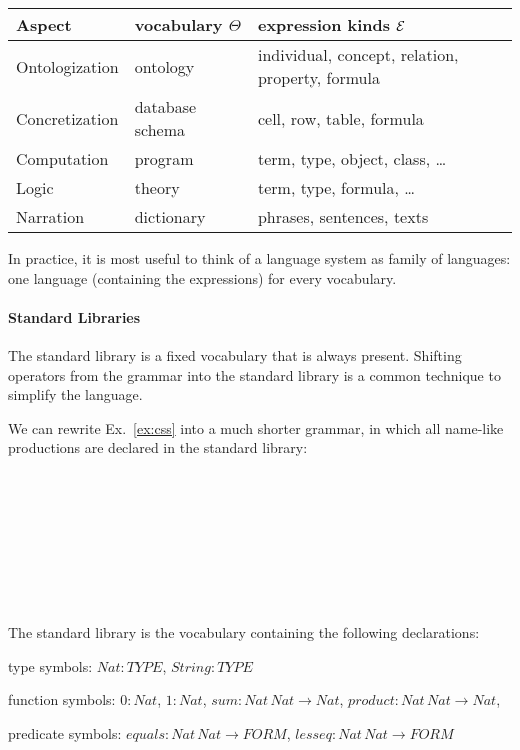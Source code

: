 \begin{center}
\begin{tabular}{l|ll}
Aspect & vocabulary $\Theta$ & expression kinds $\mathcal{E}$ \\
\hline
Ontologization  & ontology & individual, concept, relation, property, formula \\
Concretization & database schema & cell, row, table, formula \\
Computation & program & term, type, object, class, \ldots \\
Logic & theory & term, type, formula, \ldots \\
Narration & dictionary & phrases, sentences, texts \\
\end{tabular}
\end{center}

In practice, it is most useful to think of a language system as family of languages: one language (containing the expressions) for every vocabulary.

\paragraph{Standard Libraries}
The standard library is a fixed vocabulary that is always present.
Shifting operators from the grammar into the standard library is a common technique to simplify the language.

\begin{example}\label{ex:css2}
We can rewrite Ex.~\ref{ex:css} into a much shorter grammar, in which all name-like productions are declared in the standard library:
\begin{commgrammar}
\\
\\
\\
\\
\\
\\
\\
\end{commgrammar}

The standard library is the vocabulary containing the following declarations:
\begin{compactitem}
\item type symbols: $Nat: TYPE$, $String:TYPE$
\item function symbols: $0:Nat$, $1:Nat$, $sum: Nat\,Nat\to Nat$, $product: Nat\,Nat\to Nat$,
\item predicate symbols: $equals: Nat\,Nat\to FORM$, $lesseq: Nat\,Nat\to FORM$
\end{compactitem}
\end{example}

